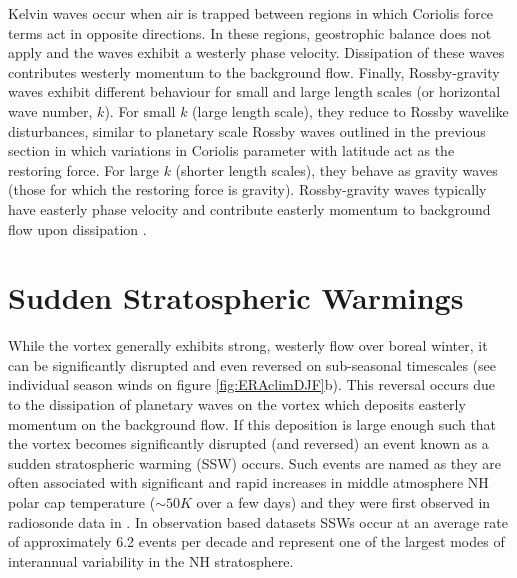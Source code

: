 Kelvin waves occur when air is trapped between regions in which Coriolis force terms act in opposite directions. In these regions, geostrophic balance does not apply and the waves exhibit a westerly phase velocity. Dissipation of these waves contributes westerly momentum to the background flow. Finally, Rossby-gravity waves exhibit different behaviour for small and large length scales (or horizontal wave number, $k$). For small $k$ (large length scale), they reduce to Rossby wavelike disturbances, similar to planetary scale Rossby waves outlined in the previous section in which variations in Coriolis parameter with latitude act as the restoring force. For large $k$ (shorter length scales), they behave as gravity waves (those for which the restoring force is gravity). Rossby-gravity waves typically have easterly phase velocity and contribute easterly momentum to background flow upon dissipation \citep{andrewsPlanetary1976}.

\section{Sudden Stratospheric Warmings}
\label{sec:SSWs}
While the vortex generally exhibits strong, westerly flow over boreal winter, it can be significantly disrupted and even reversed on sub-seasonal timescales
(see individual season winds on figure \ref{fig:ERAclimDJF}b). This reversal occurs due to the dissipation of planetary waves on the vortex which deposits easterly momentum on the background flow. If this deposition is large enough such that the vortex becomes significantly disrupted (and reversed) an event known as a sudden stratospheric warming (SSW) occurs. Such events are named as they are often associated with significant and rapid increases in middle atmosphere NH polar cap temperature ($\sim50K$ over a few days) and they were first observed in radiosonde data in \cite{scherhagExplosionsartigen1952}. In observation based datasets SSWs occur at an average rate of approximately 6.2 events per decade \citep{butlerSudden2017} and represent one of the largest modes of interannual variability in the NH stratosphere.

